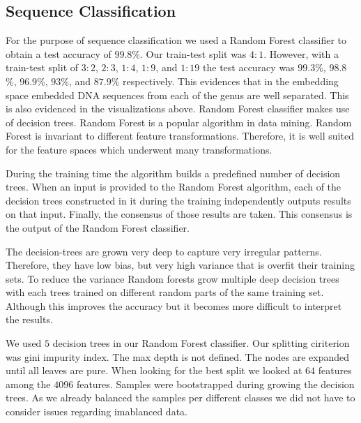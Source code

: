 \documentclass[oneside, twocolumn, a4paper, 10pt]{IEEEtran}
\begin{document}
\subsection{Sequence Classification}
For the purpose of sequence classification we used a Random Forest classifier to obtain a test accuracy of $99.8$\%. Our train-test split was $4:1$. However, with a train-test split of $3:2$, $2:3$, $1:4$, $1:9$, and $1:19$ the test accuracy was $99.3$\%, $98.8$\%, $96.9$\%, $93$\%, and $87.9$\% respectively. This evidences that in the embedding space embedded DNA sequences from each of the genus are well separated. This is also evidenced in the visualizations above. Random Forest classifier makes use of decision trees. Random Forest is a popular algorithm in data mining. Random Forest is invariant to different feature transformations. Therefore, it is well suited for the feature spaces which underwent many transformations.\\
\par
During the training time the algorithm builds a predefined number of decision trees. When an input is provided to the Random Forest algorithm, each of the decision trees constructed in it during the training independently outputs results on that input. Finally, the consensus of those results are taken. This consensus is the output of the Random Forest classifier.\\
\par 
The decision-trees are grown very deep to capture very irregular patterns. Therefore, they have low bias, but very high variance that is overfit their training sets. To reduce the variance Random forests grow multiple deep decision trees with each trees trained on different random parts of the same training set. Although this improves the accuracy but it becomes more difficult to interpret the results.\\
\par 
We used $5$ decision trees in our Random Forest classifier. Our splitting ciriterion was gini impurity index. The max depth is not defined. The nodes are expanded until all leaves are pure. When looking for the best split we looked at $64$ features among the $4096$ features. Samples were bootstrapped during growing the decision trees. As we already balanced the samples per different classes we did not have to consider issues regarding imablanced data. 
\end{document}
